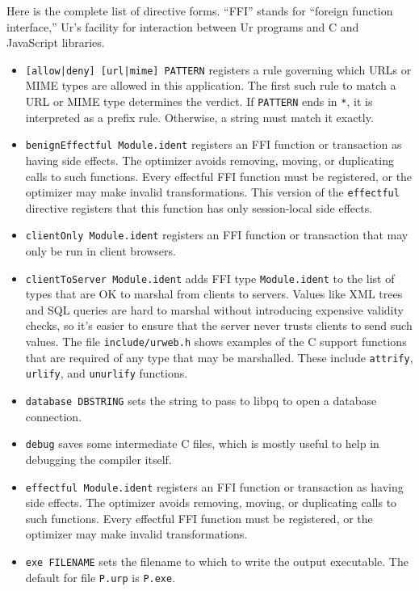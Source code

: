 \documentclass{article}
\begin{document}
Here is the complete list of directive forms.  ``FFI'' stands for ``foreign function interface,'' Ur's facility for interaction between Ur programs and C and JavaScript libraries.
\begin{itemize}
\item \texttt{[allow|deny] [url|mime] PATTERN} registers a rule governing which URLs or MIME types are allowed in this application.  The first such rule to match a URL or MIME type determines the verdict.  If \texttt{PATTERN} ends in \texttt{*}, it is interpreted as a prefix rule.  Otherwise, a string must match it exactly.
\item \texttt{benignEffectful Module.ident} registers an FFI function or transaction as having side effects.  The optimizer avoids removing, moving, or duplicating calls to such functions.  Every effectful FFI function must be registered, or the optimizer may make invalid transformations.  This version of the \texttt{effectful} directive registers that this function has only session-local side effects.
\item \texttt{clientOnly Module.ident} registers an FFI function or transaction that may only be run in client browsers.
\item \texttt{clientToServer Module.ident} adds FFI type \texttt{Module.ident} to the list of types that are OK to marshal from clients to servers.  Values like XML trees and SQL queries are hard to marshal without introducing expensive validity checks, so it's easier to ensure that the server never trusts clients to send such values.  The file \texttt{include/urweb.h} shows examples of the C support functions that are required of any type that may be marshalled.  These include \texttt{attrify}, \texttt{urlify}, and \texttt{unurlify} functions.
\item \texttt{database DBSTRING} sets the string to pass to libpq to open a database connection.
\item \texttt{debug} saves some intermediate C files, which is mostly useful to help in debugging the compiler itself.
\item \texttt{effectful Module.ident} registers an FFI function or transaction as having side effects.  The optimizer avoids removing, moving, or duplicating calls to such functions.  Every effectful FFI function must be registered, or the optimizer may make invalid transformations.
\item \texttt{exe FILENAME} sets the filename to which to write the output executable.  The default for file \texttt{P.urp} is \texttt{P.exe}.  

\end{itemize}
\end{document}

